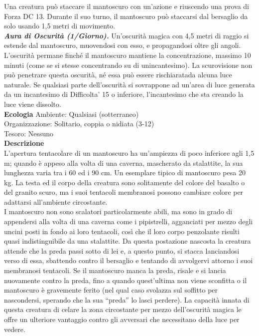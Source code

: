 \begin{multicols}{2}
Una creatura può staccare il mantoscuro con un'azione e riuscendo una prova di Forza DC 13. Durante il suo turno, il mantoscuro può staccarsi dal bersaglio da solo usando 1,5 metri di movimento.\\
\emph{\textbf{Aura di Oscurità (1/Giorno).}} Un'oscurità magica con 4,5 metri di raggio si estende dal mantoscuro, muovendosi con esso, e propagandosi oltre gli angoli. L'oscurità permane finché il mantoscuro mantiene la concentrazione, massimo 10 minuti (come se si stesse concentrando su di unincantesimo). La scurovisione non può penetrare  questa oscurità, né essa può essere rischiaratada alcuna luce naturale. Se qualsiasi parte dell'oscurità si sovrappone ad un'area di  luce generata da un incantesimo di Difficolta' 15 o inferiore, l'incantesimo che sta creando la luce viene dissolto.\\
\textbf{Ecologia}
Ambiente: Qualsiasi (sotterraneo)\\
Organizzazione: Solitario, coppia o nidiata (3-12)\\
Tesoro: Nessuno\\
\textbf{Descrizione}\\
L’apertura tentacolare di un mantoscuro ha un’ampiezza di poco inferiore agli 1,5 m; quando è appeso alla volta di una caverna, mascherato da stalattite, la sua lunghezza varia tra i 60 ed i 90 cm. Un esemplare tipico di mantoscuro pesa 20 kg. La testa ed il corpo della creatura sono solitamente del colore del basalto o del granito scuro, ma i suoi tentacoli membranosi possono cambiare colore per adattarsi all’ambiente circostante.\\

I mantoscuro non sono scalatori particolarmente abili, ma sono in grado di appendersi alla volta di una caverna come i pipistrelli, agganciati per mezzo degli uncini posti in fondo ai loro tentacoli, così che il loro corpo penzolante risulti quasi indistinguibile da una stalattite. Da questa postazione nascosta la creatura attende che la preda passi sotto di lei e, a questo punto, si stacca lanciandosi verso di essa, sbattendo contro il bersaglio e tentando di avvolgervi attorno i suoi membranosi tentacoli. Se il mantoscuro manca la preda, risale e si lancia nuovamente contro la preda, fino a quando quest’ultima non viene sconfitta o il mantoscuro è gravemente ferito (nel qual caso svolazza sul soffitto per nascondersi, sperando che la sua “preda” lo lasci perdere). La capacità innata di questa creatura di celare la zona circostante per mezzo dell’oscurità magica le offre un ulteriore vantaggio contro gli avversari che necessitano della luce per vedere.\\


\end{multicols}
